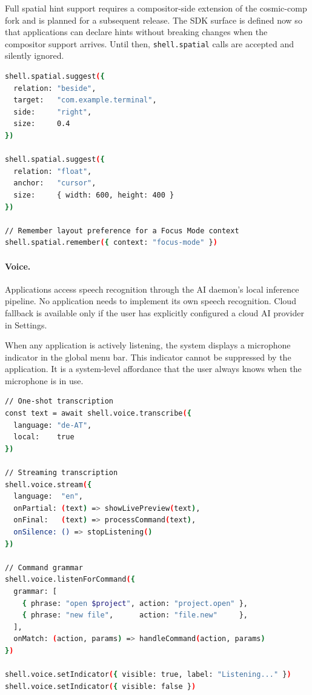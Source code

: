 Full spatial hint support requires a compositor-side extension of the
cosmic-comp fork and is planned for a subsequent release. The SDK surface
is defined now so that applications can declare hints without breaking changes
when the compositor support arrives. Until then, \texttt{shell.spatial} calls
are accepted and silently ignored.

\begin{lstlisting}[language=bash, caption={shell.spatial}]
shell.spatial.suggest({
  relation: "beside",
  target:   "com.example.terminal",
  side:     "right",
  size:     0.4
})

shell.spatial.suggest({
  relation: "float",
  anchor:   "cursor",
  size:     { width: 600, height: 400 }
})

// Remember layout preference for a Focus Mode context
shell.spatial.remember({ context: "focus-mode" })
\end{lstlisting}

\paragraph{Voice.}
Applications access speech recognition through the AI daemon's local
inference pipeline. No application needs to implement its own speech
recognition. Cloud fallback is available only if the user has explicitly
configured a cloud AI provider in Settings.

When any application is actively listening, the system displays a microphone
indicator in the global menu bar. This indicator cannot be suppressed by the
application. It is a system-level affordance that the user always knows when
the microphone is in use.

\begin{lstlisting}[language=bash, caption={shell.voice}]
// One-shot transcription
const text = await shell.voice.transcribe({
  language: "de-AT",
  local:    true
})

// Streaming transcription
shell.voice.stream({
  language:  "en",
  onPartial: (text) => showLivePreview(text),
  onFinal:   (text) => processCommand(text),
  onSilence: () => stopListening()
})

// Command grammar
shell.voice.listenForCommand({
  grammar: [
    { phrase: "open $project", action: "project.open" },
    { phrase: "new file",      action: "file.new"     },
  ],
  onMatch: (action, params) => handleCommand(action, params)
})

shell.voice.setIndicator({ visible: true, label: "Listening..." })
shell.voice.setIndicator({ visible: false })
\end{lstlisting}
\label{sec:menubar}

